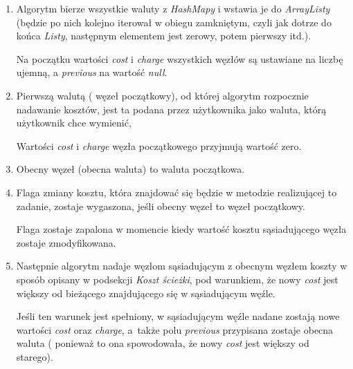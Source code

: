 \documentclass[a4paper,11pt]{article}
\begin{document}
\begin{enumerate}
\item Algorytm bierze wszystkie waluty z \textit{HashMapy} i wstawia je do \textit{ArrayListy} (będzie po nich kolejno iterował w obiegu zamkniętym, czyli jak dotrze do końca \textit{Listy}, następnym elementem jest zerowy, potem pierwszy itd.).

		Na początku wartości \textit{cost} i \textit{charge} wszystkich węzłów są ustawiane na liczbę ujemną, a \textit{previous} na wartość \textit{null}.
\item Pierwszą walutą ( węzeł początkowy), od której algorytm rozpocznie nadawanie kosztów, jest ta podana przez użytkownika jako waluta, którą użytkownik chce wymienić,

		Wartości \textit{cost} i \textit{charge} węzła początkowego przyjmują wartość zero.
\item Obecny węzeł (obecna waluta) to waluta początkowa.
\item Flaga zmiany kosztu, która znajdować się będzie w metodzie realizującej to zadanie, zostaje wygaszona, jeśli obecny węzeł to węzeł początkowy.

Flaga zostaje zapalona w momencie kiedy wartość kosztu sąsiadującego węzła zostaje zmodyfikowana.
\item Następnie algorytm nadaje węzłom sąsiadującym z obecnym węzłem koszty w sposób opisany w podsekcji \textit{Koszt ścieżki}, pod warunkiem, że nowy \textit{cost} jest większy od bieżącego znajdującego się w sąsiadującym węźle.

Jeśli ten warunek jest spełniony, w sąsiadującym węźle nadane zostają nowe wartości \textit{cost} oraz \textit{charge}, a~także polu \textit{previous} przypisana zostaje obecna waluta ( ponieważ to ona spowodowała, że nowy \textit{cost} jest większy od starego).


\end{enumerate}
\end{document}
